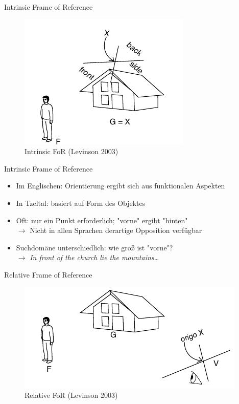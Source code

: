 \documentclass[12pt,a4paper]{beamer}
\begin{document}
\begin{frame}{Intrinsic Frame of Reference}
\begin{figure}
\includegraphics[scale=0.45]{img/levinson_FOR_intrinsic.png}
\caption{Intrinsic FoR (Levinson 2003)}
\end{figure}
\end{frame}

\begin{frame}{Intrinsic Frame of Reference}
\begin{itemize}
\item Im Englischen: Orientierung ergibt sich aus funktionalen Aspekten
\item In Tzeltal: basiert auf Form des Objektes
\item Oft: nur ein Punkt erforderlich; "vorne" ergibt "hinten" \\
$\to$ Nicht in allen Sprachen derartige Opposition verfügbar
\item Suchdomäne unterschiedlich: wie groß ist "vorne"? \\
$\to$ \textit{In front of the church lie the mountains\ldots}
\end{itemize}
\end{frame}


\begin{frame}{Relative Frame of Reference}
\begin{figure}
\includegraphics[scale=0.45]{img/levinson_FOR_relative.png}
\caption{Relative FoR (Levinson 2003)}
\end{figure}
\end{frame}
\end{document}
